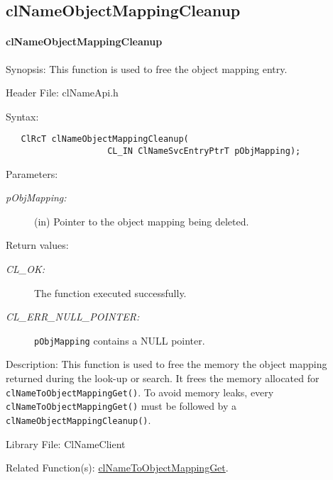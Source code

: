 \begin{flushleft}
\subsection{clNameObjectMappingCleanup}
\hypertarget{pagens110}{}\paragraph{cl\-Name\-Object\-Mapping\-Cleanup}\label{pagens110}
\begin{Desc}
\item[Synopsis:]This function is used to free the object mapping entry.\end{Desc}
\begin{Desc}
\item[Header File:]clNameApi.h\end{Desc}
\begin{Desc}
\item[Syntax:]

\footnotesize\begin{verbatim}   ClRcT clNameObjectMappingCleanup(
					CL_IN ClNameSvcEntryPtrT pObjMapping);
\end{verbatim}
\normalsize
\end{Desc}
\begin{Desc}
\item[Parameters:]
\begin{description}
\item[{\em p\-Obj\-Mapping:}](in) Pointer to the object mapping being deleted.\end{description}
\end{Desc}
\begin{Desc}
\item[Return values:]
\begin{description}
\item[{\em CL\_\-OK:}]The function executed successfully. 
\item[{\em CL\_\-ERR\_\-NULL\_\-POINTER:}]{\tt{pObjMapping}} contains a NULL pointer.\end{description}
\end{Desc}
\begin{Desc}
\item[Description:]This function is used to free the memory the object mapping returned during the look-up or search. It frees the  memory allocated for 
{\tt{clNameToObjectMappingGet()}}. To avoid memory leaks, every {\tt{clNameToObjectMappingGet()}} must be followed by a {\tt{clNameObjectMappingCleanup()}}. 
\end{Desc}
\begin{Desc}
\item[Library File:]Cl\-Name\-Client\end{Desc}
\begin{Desc}
\item[Related Function(s):]\hyperlink{pagens109}{cl\-Name\-To\-Object\-Mapping\-Get}. \end{Desc}
\newpage



\end{flushleft}
